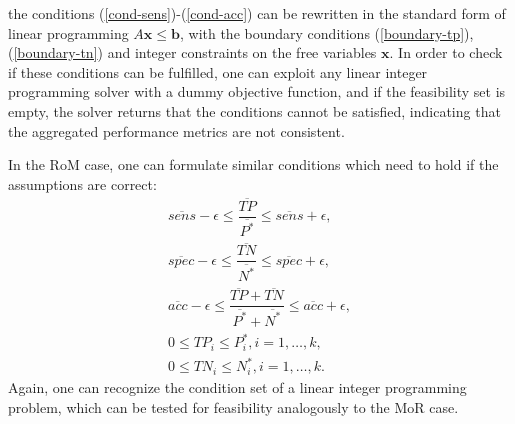 \documentclass[5p, final]{elsarticle}
\begin{document}
the conditions (\ref{cond-sens})-(\ref{cond-acc}) can be rewritten in the standard form of linear programming
$A\mathbf{x}  \leq \mathbf{b}$,
with the boundary conditions (\ref{boundary-tp}), (\ref{boundary-tn}) and integer constraints on the free variables $\mathbf{x}$. In order to check if these conditions can be fulfilled, one can exploit any linear integer programming solver with a dummy objective function, and if the feasibility set is empty, the solver returns that the conditions cannot be satisfied, indicating that the aggregated performance metrics are not consistent.


In the RoM case, one can formulate similar conditions which need to hold if the assumptions are correct:
\begin{align}
\overline{sens} - \epsilon \leq \dfrac{\overline{TP}}{\overline{P^*}} \leq \overline{sens} + \epsilon, \\
\overline{spec} - \epsilon \leq \dfrac{\overline{TN}}{\overline{N^*}} \leq \overline{spec} + \epsilon, \\
\overline{acc} - \epsilon \leq \dfrac{\overline{TP} + \overline{TN}}{\overline{P^*} + \overline{N^*}} \leq \overline{acc} + \epsilon, \\
0 \leq TP_i \leq P_i^*, i=1, \dots, k, \\
0 \leq TN_i \leq N_i^*, i=1, \dots, k.
\end{align}
Again, one can recognize the condition set of a linear integer programming problem, which can be tested for feasibility analogously to the MoR case.




\end{document}
